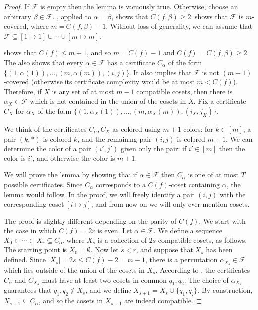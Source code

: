 \documentclass[10pt,a4paper]{article}
\theoremstyle{definition}
\providecommand{\coset}[2]{[#1 \mapsto #2]}
\begin{document}
\begin{proof}
If $\mathcal{F}$ is empty then the lemma is vacuously true. Otherwise, choose an arbitrary $\beta \in \mathcal{F}$. , applied to $\alpha = \beta$, shows that $C(f,\beta) \geq 2$.  shows that $\mathcal{F}$ is $m$-covered, where $m = C(f,\beta) - 1$. Without loss of generality, we can assume that $\mathcal{F} \subseteq \coset{1}{1} \cup \cdots \cup \coset{m}{m}$.

 shows that $C(f) \leq m + 1$, and so $m = C(f) - 1$ and $C(f) = C(f,\beta) \geq 2$. The  also shows that every $\alpha \in \mathcal{F}$ has a certificate $C_\alpha$ of the form $\{(1,\alpha(1)),\ldots,(m,\alpha(m)),(i,j)\}$.
It also implies that $\mathcal{F}$ is not $(m-1)$-covered (otherwise its certificate complexity would be at most $m < C(f)$). Therefore, if $X$ is any set of at most $m-1$ compatible cosets, then there is $\alpha_X \in \mathcal{F}$ which is not contained in the union of the cosets in $X$. Fix a certificate $C_X$ for $\alpha_X$ of the form $\{(1,\alpha_X(1)),\ldots,(m,\alpha_X(m)),(i_X,j_X)\}$.

We think of the certificates $C_\alpha,C_X$ as colored using $m + 1$ colors: for $k \in [m]$, a pair $(k,\ast)$ is colored $k$, and the remaining pair $(i,j)$ is colored $m+1$. We can determine the color of a pair $(i',j')$ given only the pair: if $i' \in [m]$ then the color is $i'$, and otherwise the color is $m+1$.

We will prove the lemma by showing that if $\alpha \in \mathcal{F}$ then $C_\alpha$ is one of at most $T$ possible certificates. Since $C_\alpha$ corresponds to a $C(f)$-coset containing $\alpha$, the lemma would follow.
In the proof, we will freely identify a pair $(i,j)$ with the corresponding coset $\coset{i}{j}$, and from now on we will only ever mention cosets.

\smallskip

The proof is slightly different depending on the parity of $C(f)$. We start with the case in which $C(f) = 2r$ is even. Let $\alpha \in \mathcal{F}$.
We define a sequence $X_0 \subset \cdots \subset X_r \subseteq C_\alpha$, where $X_s$ is a collection of $2s$ compatible cosets, as follows. The starting point is $X_0 = \emptyset$. Now let $s < r$, and suppose that $X_s$ has been defined.  Since $|X_s| = 2s \leq C(f) - 2 = m - 1$, there is a permutation $\alpha_{X_s} \in \mathcal{F}$ which lies outside of the union of the cosets in $X_s$. According to , the certificates $C_\alpha$ and $C_{X_s}$ must have at least two cosets in common $q_1,q_2$. The choice of $\alpha_{X_s}$ guarantees that $q_1,q_2 \notin X_s$, and we define $X_{s+1} = X_s \cup \{q_1,q_2\}$. By construction, $X_{s+1} \subseteq C_\alpha$, and so the cosets in $X_{s+1}$ are indeed compatible.


\end{proof}
\end{document}
